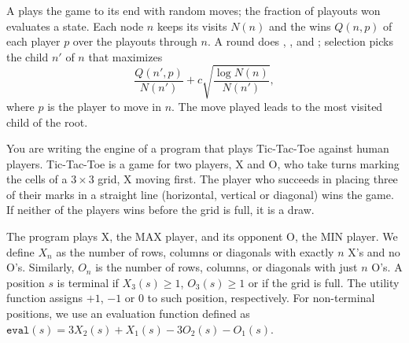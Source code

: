 \documentclass[11pt, a4paper]{exam}
\begin{document}
\begin{recap}
    A  plays the game to its end with random moves; the fraction of playouts won evaluates a state. Each node $n$ keeps its visits $N(n)$ and the wins $Q(n, p)$ of each player $p$ over the playouts through $n$. A round does , ,  and ; selection picks the child $n'$ of $n$ that maximizes
    \[
        \frac{Q(n', p)}{N(n')} + c \sqrt{\frac{\log N(n)}{N(n')}},
    \]
    where $p$ is the player to move in $n$. The move played leads to the most visited child of the root.
\end{recap}

\begin{exercises}[1, 2, 6]


You are writing the engine of a program that plays Tic-Tac-Toe against human players. Tic-Tac-Toe is a game for two players, X and O, who take turns marking the cells of a $3 \times 3$ grid, X moving first. The player who succeeds in placing three of their marks in a straight line (horizontal, vertical or diagonal) wins the game. If neither of the players wins before the grid is full, it is a draw.

The program plays X, the MAX player, and its opponent O, the MIN player. We define $X_n$ as the number of rows, columns or diagonals with exactly $n$ X's and no O's. Similarly, $O_n$ is the number of rows, columns, or diagonals with just $n$ O's. A position $s$ is terminal if $X_3(s) \geq 1$, $O_3(s) \geq 1$ or if the grid is full. The utility function assigns $+1$, $-1$ or $0$ to such position, respectively. For non-terminal positions, we use an evaluation function defined as $\texttt{eval}(s) = 3 X_2(s) + X_1(s) - 3 O_2(s) - O_1(s)$.

\end{exercises}
\end{document}
